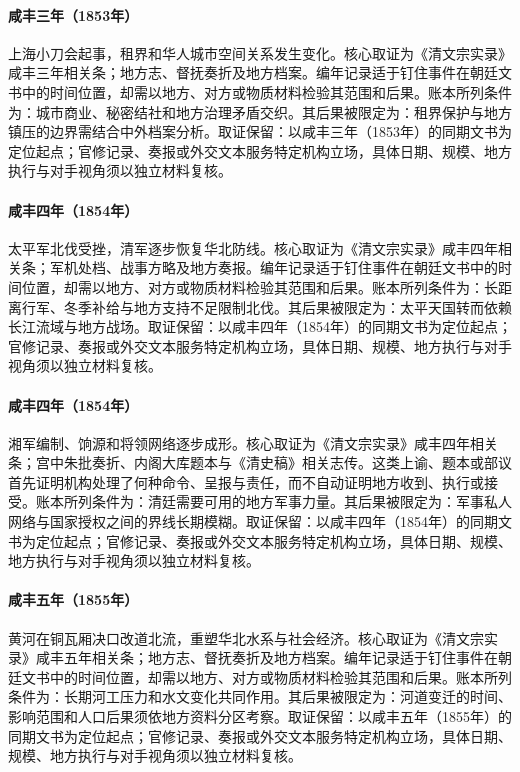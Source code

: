 \hypertarget{ledger:EQ-1853-SMALL-SWORDS-SHANGHAI}{}\paragraph{咸丰三年（1853年）}上海小刀会起事，租界和华人城市空间关系发生变化。核心取证为《清文宗实录》咸丰三年相关条；地方志、督抚奏折及地方档案。编年记录适于钉住事件在朝廷文书中的时间位置，却需以地方、对方或物质材料检验其范围和后果。账本所列条件为：城市商业、秘密结社和地方治理矛盾交织。其后果被限定为：租界保护与地方镇压的边界需结合中外档案分析。取证保留：以咸丰三年（1853年）的同期文书为定位起点；官修记录、奏报或外交文本服务特定机构立场，具体日期、规模、地方执行与对手视角须以独立材料复核。
\hypertarget{ledger:EQ-1854-TAIPING-NORTHERN-DEFEAT}{}\paragraph{咸丰四年（1854年）}太平军北伐受挫，清军逐步恢复华北防线。核心取证为《清文宗实录》咸丰四年相关条；军机处档、战事方略及地方奏报。编年记录适于钉住事件在朝廷文书中的时间位置，却需以地方、对方或物质材料检验其范围和后果。账本所列条件为：长距离行军、冬季补给与地方支持不足限制北伐。其后果被限定为：太平天国转而依赖长江流域与地方战场。取证保留：以咸丰四年（1854年）的同期文书为定位起点；官修记录、奏报或外交文本服务特定机构立场，具体日期、规模、地方执行与对手视角须以独立材料复核。
\hypertarget{ledger:EQ-1854-XIANG-ARMY-ORGANIZATION}{}\paragraph{咸丰四年（1854年）}湘军编制、饷源和将领网络逐步成形。核心取证为《清文宗实录》咸丰四年相关条；宫中朱批奏折、内阁大库题本与《清史稿》相关志传。这类上谕、题本或部议首先证明机构处理了何种命令、呈报与责任，而不自动证明地方收到、执行或接受。账本所列条件为：清廷需要可用的地方军事力量。其后果被限定为：军事私人网络与国家授权之间的界线长期模糊。取证保留：以咸丰四年（1854年）的同期文书为定位起点；官修记录、奏报或外交文本服务特定机构立场，具体日期、规模、地方执行与对手视角须以独立材料复核。
\hypertarget{ledger:EQ-1855-YELLOW-RIVER-COURSE-SHIFT}{}\paragraph{咸丰五年（1855年）}黄河在铜瓦厢决口改道北流，重塑华北水系与社会经济。核心取证为《清文宗实录》咸丰五年相关条；地方志、督抚奏折及地方档案。编年记录适于钉住事件在朝廷文书中的时间位置，却需以地方、对方或物质材料检验其范围和后果。账本所列条件为：长期河工压力和水文变化共同作用。其后果被限定为：河道变迁的时间、影响范围和人口后果须依地方资料分区考察。取证保留：以咸丰五年（1855年）的同期文书为定位起点；官修记录、奏报或外交文本服务特定机构立场，具体日期、规模、地方执行与对手视角须以独立材料复核。
